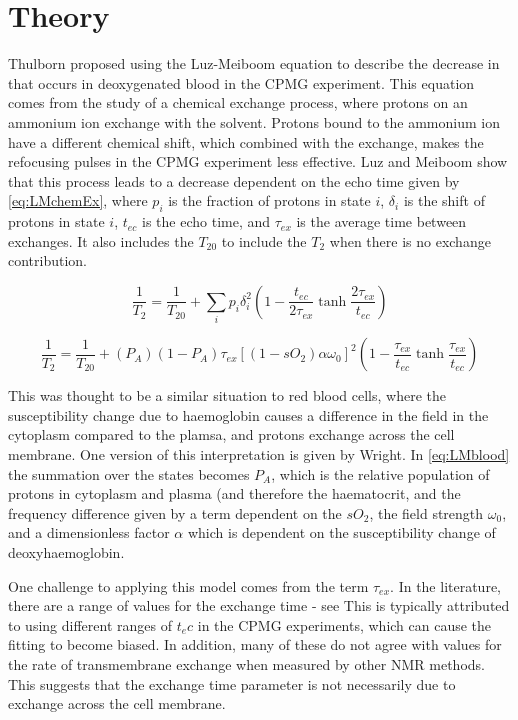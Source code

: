 \section{Theory}
Thulborn proposed using the Luz-Meiboom equation to describe the decrease in \Ttwo that occurs in deoxygenated blood in the CPMG experiment.
This equation comes from the study of a chemical exchange process, where protons on an ammonium ion exchange with the solvent\cite{LuzNuclearMagneticResonance1963}.
Protons bound to the ammonium ion have a different chemical shift, which combined with the exchange, makes the refocusing pulses in the CPMG experiment less effective.
Luz and Meiboom show that this process leads to a \Ttwo decrease dependent on the echo time given by \autoref{eq:LMchemEx}\cite{LuzNuclearMagneticResonance1963}, where $p_i$ is the fraction of protons in state $i$, $\delta_i$ is the shift of protons in state $i$, $t_{ec}$ is the echo time, and $\tau_{ex}$ is the average time between exchanges. It also includes the $T_{20}$ to include the $T_2$ when there is no exchange contribution.

\begin{equation}
\label{eq:LMchemEx}
\frac{1}{T_2} = \frac{1}{T_{20}} + \sum_i{p_i\delta_i^2} (1 - \frac{t_{ec}}{2\tau_{ex}} \tanh{\frac{2\tau_{ex}}{t_{ec}}})
\end{equation}

\begin{equation}
\label{eq:LMblood}
\frac{1}{T_2} = \frac{1}{T_{20}} +(P_A)(1 - P_A)\tau_{ex} \left[(1-sO_2)\alpha\omega_0\right]^2 \left(1 - \frac{\tau_{ex}}{t_{ec}} \tanh{\frac{\tau_{ex}}{t_{ec}}}\right)
\end{equation}

This was thought to be a similar situation to red blood cells, where the susceptibility change due to haemoglobin causes a difference in the field in the cytoplasm compared to the plamsa, and protons exchange across the cell membrane.
One version of this interpretation is given by Wright\cite{WrightEstimatingoxygensaturation1991}. In \autoref{eq:LMblood} the summation over the states becomes $P_A$, which is the relative population of protons in cytoplasm and plasma (and therefore the haematocrit, and the frequency difference given by a term dependent on the $sO_2$, the field strength $\omega_0$, and a dimensionless factor $\alpha$ which is dependent on the susceptibility change of deoxyhaemoglobin.

One challenge to applying this model comes from the term $\tau_{ex}$.
In the literature, there are a range of values for the exchange time - see %
This is typically attributed to using different ranges of $t_ec$ in the CPMG experiments, which can cause the fitting to become biased.
In addition, many of these do not agree with values for the rate of transmembrane exchange when measured by other NMR methods.
This suggests that the exchange time parameter is not necessarily due to exchange across the cell membrane.

